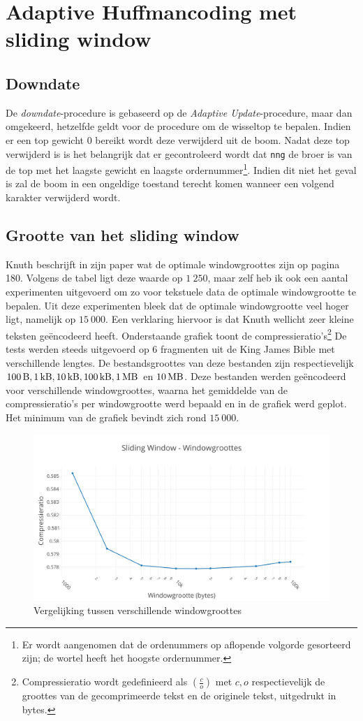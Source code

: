 \section{Adaptive Huffmancoding met sliding window}

\subsection{Downdate}
De \emph{downdate}-procedure is gebaseerd op de \emph{Adaptive Update}-procedure, maar dan omgekeerd, hetzelfde geldt voor de procedure om de wisseltop te bepalen. Indien er een top gewicht $0$ bereikt wordt deze verwijderd uit de boom. Nadat deze top verwijderd is is het belangrijk dat er gecontroleerd wordt dat \texttt{nng} de broer is van de top met het laagste gewicht en laagste ordernummer\footnote{Er wordt aangenomen dat de ordenummers op aflopende volgorde gesorteerd zijn; de wortel heeft het hoogste ordernummer.}. Indien dit niet het geval is zal de boom in een ongeldige toestand terecht komen wanneer een volgend karakter verwijderd wordt. 

\subsection{Grootte van het sliding window}
Knuth beschrijft in zijn paper \cite{knuthhuffman} wat de optimale windowgroottes zijn op pagina 180. Volgens de tabel ligt deze waarde op \texttt{$1\ 250$}, maar zelf heb ik ook een aantal experimenten uitgevoerd om zo voor tekstuele data de optimale windowgrootte te bepalen. Uit deze experimenten bleek dat de optimale windowgrootte veel hoger ligt, namelijk op \texttt{$15\ 000$}. Een verklaring hiervoor is dat Knuth wellicht zeer kleine teksten ge\"encodeerd heeft. Onderstaande grafiek toont de compressieratio's\footnote{Compressieratio wordt gedefinieerd als $(\frac{c}{o})$ met $c,o$ respectievelijk de groottes van de gecomprimeerde tekst en de originele tekst, uitgedrukt in bytes.} De tests werden steeds uitgevoerd op 6 fragmenten uit de King James Bible \cite{gutenbergbible} met verschillende lengtes. De bestandsgroottes van deze bestanden zijn respectievelijk $\SI{100}{\byte}, \SI{1}{\kilo\byte}, \SI{10}{\kilo\byte}, \SI{100}{\kilo\byte}, \SI{1}{\mega\byte}$ en $\SI{10}{\mega\byte}$. Deze bestanden werden ge\"encodeerd voor verschillende windowgroottes, waarna het gemiddelde van de compressieratio's per windowgrootte werd bepaald en in de grafiek werd geplot. Het minimum van de grafiek bevindt zich rond \texttt{$15\ 000$}.

\begin{figure}
	\centering
	\includegraphics[width=0.9\linewidth]{resources/sliding-window.png}
	\caption{Vergelijking tussen verschillende windowgroottes}
\end{figure}